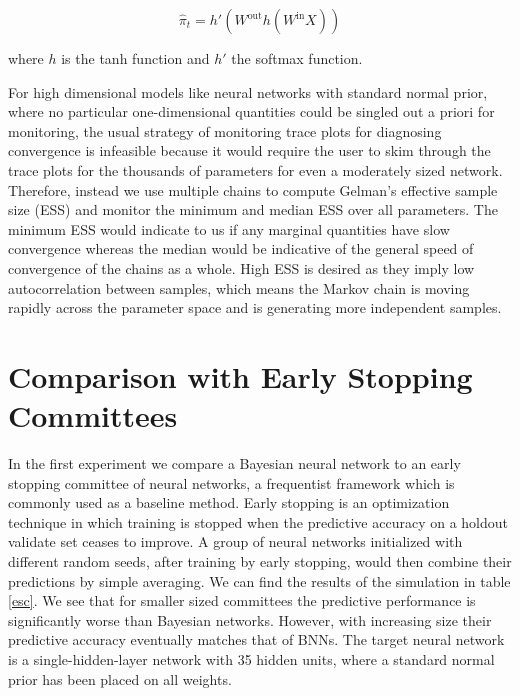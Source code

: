 \documentclass[12pt]{report}
\begin{document}
\[\hat{\pi}_t =   h'(W^{\text{out}}h(W^{\text{in}}X)) \]

where $h$ is the tanh function and $h'$ the softmax function.

For high dimensional models like neural networks with standard normal prior, where no particular one-dimensional quantities could be singled out a priori for monitoring, the usual strategy of monitoring trace plots for diagnosing convergence is infeasible because it would require the user to skim through the trace plots for the thousands of parameters for even a moderately sized network. Therefore, instead we use multiple chains to compute Gelman's effective sample size (ESS) \cite{gelman2014bayesian} and monitor the minimum and median ESS over all parameters. The minimum ESS would indicate to us if any marginal quantities have slow convergence whereas the median would be indicative of the general speed of convergence of the chains as a whole. High ESS is desired as they imply low autocorrelation between samples, which means the Markov chain is moving rapidly across the parameter space and is generating more independent samples.

\section{Comparison with Early Stopping Committees}

In the first experiment we compare a Bayesian neural network to an early stopping committee of neural networks, a frequentist framework which is commonly used as a baseline method. Early stopping is an optimization technique in which training is stopped when the predictive accuracy on a holdout validate set ceases to improve. A group of neural networks initialized with different random seeds, after training by early stopping,  would then combine their predictions by simple averaging. We can find the results of the simulation in table \ref{esc}. We see that for smaller sized committees the predictive performance is significantly worse than Bayesian networks. However, with increasing size their predictive accuracy eventually matches that of BNNs. The target neural network is a single-hidden-layer network with 35 hidden units, where a standard normal prior has been placed on all weights. 
\end{document}
